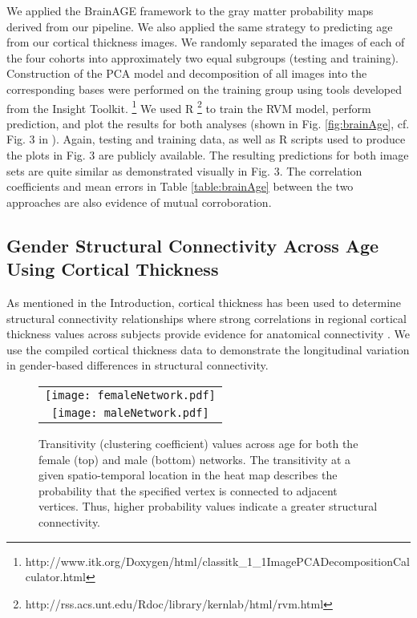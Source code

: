 We applied the BrainAGE framework to the gray matter probability maps derived
from our pipeline.  We also applied the same strategy to predicting age from 
our cortical thickness images.  We randomly separated the images of each of the 
four cohorts into approximately two equal subgroups (testing and training).
Construction of the PCA model and decomposition of all images into the corresponding 
bases were performed on the training group using tools developed from the Insight Toolkit.%
\footnote{
http://www.itk.org/Doxygen/html/classitk\_1\_1ImagePCADecompositionCalculator.html  
}
We used R%
\footnote{
http://rss.acs.unt.edu/Rdoc/library/kernlab/html/rvm.html
} 
to train the RVM model, perform prediction, and plot the results for both
analyses (shown in Fig. \ref{fig:brainAge}, cf. Fig. 3 in \cite{franke2010}).
Again, testing and training data, as well as R scripts used to produce the 
plots in Fig. 3 are publicly available.  
The resulting predictions for both image sets are quite similar as demonstrated 
visually in Fig. 3.  The correlation coefficients and mean errors in Table 
\ref{table:brainAge} between the
two approaches are also evidence of mutual corroboration.

\subsection{Gender Structural Connectivity Across Age Using Cortical Thickness}
As mentioned in the Introduction, cortical thickness has
been used to determine structural connectivity relationships 
where strong correlations in regional cortical 
thickness values across subjects provide evidence for anatomical
connectivity \citep{he2007,chen2008,he2008}.
We use the compiled cortical thickness data to demonstrate the longitudinal
variation in gender-based differences in structural connectivity.




\begin{figure*}
  \centering
  \begin{tabular}{c}
  \texttt{[image: femaleNetwork.pdf]} \\
  \texttt{[image: maleNetwork.pdf]}
  \end{tabular}
  \caption{Transitivity (clustering coefficient) values across age for both the female (top)
  and male (bottom) networks.  The transitivity at a given spatio-temporal
  location in the heat map describes the probability that the specified 
  vertex is connected to adjacent vertices.  Thus, higher probability values indicate a
  greater structural connectivity.
  }
  \label{fig:network}
\end{figure*}

